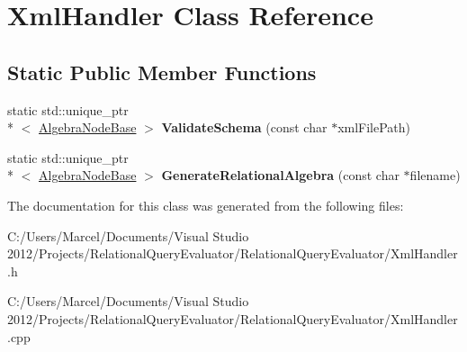 \hypertarget{class_xml_handler}{\section{Xml\+Handler Class Reference}
\label{class_xml_handler}
}
\subsection*{Static Public Member Functions}
\begin{DoxyCompactItemize}
\item 
\hypertarget{class_xml_handler_ae43484089c410e94ea54c1f8e7545559}{static std\+::unique\+\_\+ptr\\*
$<$ \hyperlink{class_algebra_node_base}{Algebra\+Node\+Base} $>$ {\bfseries Validate\+Schema} (const char $\ast$xml\+File\+Path)}\label{class_xml_handler_ae43484089c410e94ea54c1f8e7545559}

\item 
\hypertarget{class_xml_handler_a055645461fb5e727208e3282176e4220}{static std\+::unique\+\_\+ptr\\*
$<$ \hyperlink{class_algebra_node_base}{Algebra\+Node\+Base} $>$ {\bfseries Generate\+Relational\+Algebra} (const char $\ast$filename)}\label{class_xml_handler_a055645461fb5e727208e3282176e4220}

\end{DoxyCompactItemize}


The documentation for this class was generated from the following files\+:\begin{DoxyCompactItemize}
\item 
C\+:/\+Users/\+Marcel/\+Documents/\+Visual Studio 2012/\+Projects/\+Relational\+Query\+Evaluator/\+Relational\+Query\+Evaluator/Xml\+Handler.\+h\item 
C\+:/\+Users/\+Marcel/\+Documents/\+Visual Studio 2012/\+Projects/\+Relational\+Query\+Evaluator/\+Relational\+Query\+Evaluator/Xml\+Handler.\+cpp\end{DoxyCompactItemize}
